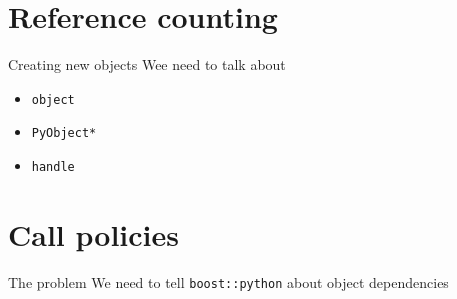 
\section{Reference counting}
\begin{frame}{Creating new objects}
    Wee need to talk about 
    \begin{itemize}
        \item \texttt{object}
        \item \texttt{PyObject*}
        \item \texttt{handle}
    \end{itemize}
\end{frame}


\section{Call policies}

\begin{frame}{The problem}
    We need to tell \texttt{boost::python} about object dependencies
\end{frame}
